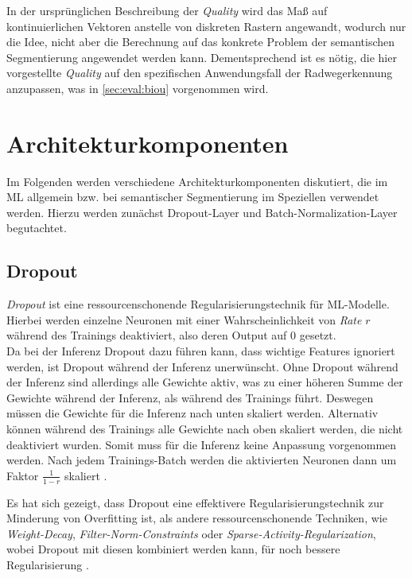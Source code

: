 In der ursprünglichen Beschreibung der \textit{Quality} wird das Maß auf kontinuierlichen Vektoren anstelle von diskreten Rastern angewandt, wodurch nur die 
Idee, nicht aber die Berechnung auf das konkrete Problem der semantischen Segmentierung angewendet werden kann. Dementsprechend ist es nötig, 
die hier vorgestellte \textit{Quality} auf den spezifischen Anwendungsfall der Radwegerkennung anzupassen, 
was in \autoref{sec:eval:biou} vorgenommen wird. 

\section{Architekturkomponenten}

Im Folgenden werden verschiedene Architekturkomponenten diskutiert, die im \ac{ML} allgemein 
bzw. bei semantischer Segmentierung im Speziellen verwendet werden. Hierzu werden zunächst Dropout-Layer 
und Batch-Normalization-Layer begutachtet. 

\subsection{Dropout} \label{sec:architekturkomponenten:dropout}

\textit{Dropout} ist eine ressourcenschonende Regularisierungstechnik für \ac{ML}-Modelle. 
Hierbei werden einzelne Neuronen mit einer Wahrscheinlichkeit von \textit{Rate} $r$ während des Trainings 
deaktiviert, also deren Output auf $0$ gesetzt.\\ 
Da bei der Inferenz Dropout dazu führen kann, 
dass wichtige Features ignoriert werden, ist Dropout während der Inferenz unerwünscht. Ohne Dropout während der 
Inferenz sind allerdings alle Gewichte aktiv, was zu einer höheren Summe der Gewichte während der Inferenz, 
als während des Trainings führt. Deswegen müssen die Gewichte für die Inferenz nach unten skaliert werden. 
Alternativ können während des Trainings alle Gewichte nach oben skaliert werden, die nicht deaktiviert wurden. 
Somit muss für die Inferenz keine Anpassung vorgenommen werden. Nach jedem Trainings-Batch werden die aktivierten 
Neuronen dann um Faktor $\frac{1}{1-r}$ skaliert \cites{Goodfellow.2016}{NitishSrivastava.2014}.

Es hat sich gezeigt, dass Dropout eine effektivere Regularisierungstechnik zur Minderung von Overfitting ist, 
als andere ressourcenschonende Techniken, wie \textit{Weight-Decay}, \textit{Filter-Norm-Constraints} oder 
\textit{Sparse-Activity-Regularization}, wobei Dropout mit diesen kombiniert werden kann, für noch bessere 
Regularisierung \cites{Goodfellow.2016}.


